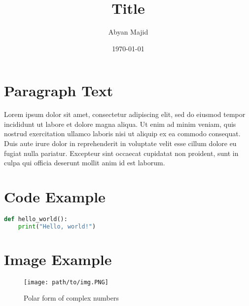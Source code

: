 \documentclass{article}
\begin{document}
\title{Title}
\author{Abyan Majid}
\date{\today}
\maketitle

\section{Paragraph Text}

Lorem ipsum dolor sit amet, consectetur adipiscing 
elit, sed do eiusmod tempor incididunt ut labore et 
dolore magna aliqua. Ut enim ad minim veniam, quis 
nostrud exercitation ullamco laboris nisi ut 
aliquip ex ea commodo consequat. Duis aute irure 
dolor in reprehenderit in voluptate velit esse 
cillum dolore eu fugiat nulla pariatur. Excepteur
sint occaecat cupidatat non proident, sunt in 
culpa qui officia deserunt mollit anim id est laborum.

\section{Code Example}

\begin{lstlisting}[language=Python, caption={Example Code Block}]
def hello_world():
    print("Hello, world!")
\end{lstlisting}

\section{Image Example}

\begin{figure}[H]
    \centering
    \texttt{[image: path/to/img.PNG]}
    \caption{Polar form of complex numbers}
\end{figure}
\end{document}
